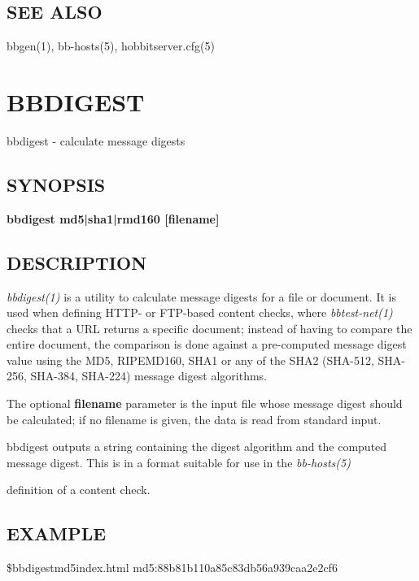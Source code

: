 \subsection{SEE ALSO}
bbgen(1), bb-hosts(5), hobbitserver.cfg(5) 

 
%
%
\newpage
\section{BBDIGEST}
 bbdigest - calculate message digests

\subsection{SYNOPSIS}
\textbf{bbdigest md5|sha1|rmd160 [filename]}


 
\subsection{DESCRIPTION}
\emph{bbdigest(1)}
 is a utility to calculate message digests for a file or document. It
 is used when defining HTTP- or FTP-based content checks, where
 \emph{bbtest-net(1)} checks that a URL returns a specific document;
 instead of having to compare the entire document, the comparison is
 done against a pre-computed message digest value using the MD5,
 RIPEMD160, SHA1 or any of the SHA2 (SHA-512, SHA-256, SHA-384,
 SHA-224) message digest algorithms. 


  The optional \textbf{filename} parameter is the input file whose
  message digest should be calculated; if no filename is given, the
  data is read from standard input. 



  bbdigest outputs a string containing the digest algorithm and the
  computed message digest. This is in a format suitable for use in the
  \emph{bb-hosts(5)}

 definition of a content check. 


 
\subsection{EXAMPLE}


\$bbdigestmd5index.html  md5:88b81b110a85c83db56a939caa2e2cf6 
  
